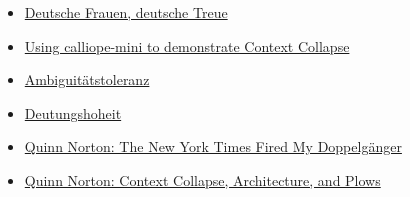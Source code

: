 \documentclass[]{article}
\begin{document}
\begin{itemize}
\item
  \href{https://www.augsburger-allgemeine.de/mindelheim/Unterallgaeu-Deutschlandlied-gesungen-AfD-Politiker-Maier-verteidigt-sich-id54274826.html}{Deutsche
  Frauen, deutsche Treue}
\item
  \href{https://bitbucket.org/tatzelbrumm/contextcollapse/src/videos/}{Using
  calliope-mini to demonstrate Context Collapse}
\item
  \href{https://de.wikipedia.org/wiki/Ambiguit\%C3\%A4tstoleranz}{Ambiguitätstoleranz}
\item
  \href{https://de.wikipedia.org/wiki/Deutungshoheit}{Deutungshoheit}
\item
  \href{https://www.theatlantic.com/technology/archive/2018/02/the-new-york-times-fired-my-doppelganger/554402/}{Quinn
  Norton: The New York Times Fired My Doppelgänger}
\item
  \href{https://medium.com/message/context-collapse-architecture-and-plows-d23a0d2f7697}{Quinn
  Norton: Context Collapse, Architecture, and Plows}
\end{itemize}
\end{document}
